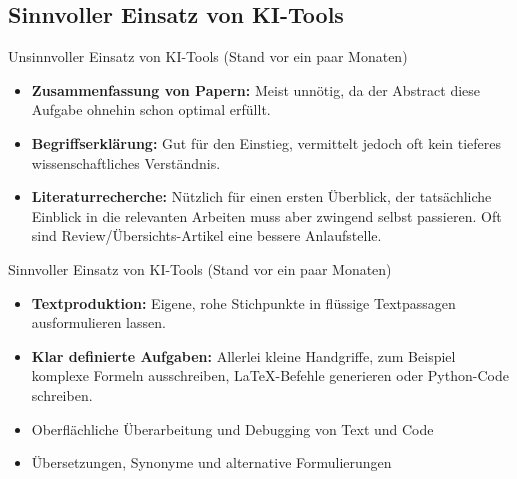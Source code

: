 \documentclass[aspectratio=\BeamerAspectRatio]{beamer}
\begin{document}
\subsection{Sinnvoller Einsatz von KI-Tools}

\begin{frame}{Unsinnvoller Einsatz von KI-Tools (Stand vor ein paar Monaten)}
    \footnotesize

    \vspace{0.5em}
    \begin{myalert}
        \begin{itemize}
            \item \textbf{Zusammenfassung von Papern:} Meist unnötig, da der Abstract diese Aufgabe ohnehin schon optimal erfüllt.
            \item \textbf{Begriffserklärung:} Gut für den Einstieg, vermittelt jedoch oft kein tieferes wissenschaftliches Verständnis.
            \item \textbf{Literaturrecherche:} Nützlich für einen ersten Überblick, der tatsächliche Einblick in die relevanten Arbeiten muss aber zwingend selbst passieren. Oft sind Review/Übersichts-Artikel eine bessere Anlaufstelle. 
        \end{itemize}
    \end{myalert}
\end{frame}

\begin{frame}{Sinnvoller Einsatz von KI-Tools (Stand vor ein paar Monaten)}
\footnotesize
\begin{mynote}
        \begin{itemize}
            \item \textbf{Textproduktion:} Eigene, rohe Stichpunkte in flüssige Textpassagen ausformulieren lassen.
            \item \textbf{Klar definierte Aufgaben:} Allerlei kleine Handgriffe, zum Beispiel komplexe Formeln ausschreiben, \LaTeX-Befehle generieren oder Python-Code schreiben.
            \item Oberflächliche Überarbeitung und Debugging von Text und Code
            \item Übersetzungen, Synonyme und alternative Formulierungen 
        \end{itemize}
    \end{mynote}
\end{frame}
\end{document}
